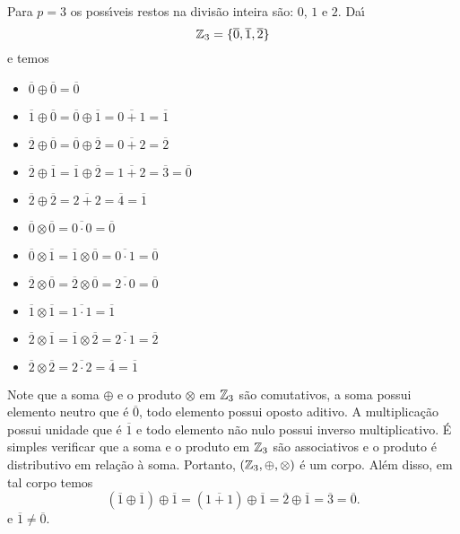 \begin{exemplo}
	Para $p = 3$ os poss{\'\i}veis restos na divis\~ao inteira s\~ao: $0$, $1$ e $2$. Da{\'\i}
	\[
	  \mathbb{Z}_3 = \{\overline{0}, \overline{1}, \overline{2}\}
	\]
	e temos
	\begin{multicols}{2}
		\begin{itemize}
			\item[] $\overline{0} \oplus \overline{0} = \overline{0}$
			\item[] $\overline{1} \oplus \overline{0} = \overline{0} \oplus \overline{1} = \overline{0 + 1} = \overline{1}$
			\item[] $\overline{2} \oplus \overline{0} = \overline{0} \oplus \overline{2} = \overline{0 + 2} = \overline{2}$
			\item[] $\overline{2} \oplus \overline{1} = \overline{1} \oplus \overline{2} = \overline{1 + 2} = \overline{3} = \overline{0}$
			\item[] $\overline{2} \oplus \overline{2} = \overline{2 + 2} = \overline{4} = \overline{1}$
			\item[] $\overline{0} \otimes \overline{0} = \overline{0\cdot 0} = \overline{0}$
			\item[] $\overline{0} \otimes \overline{1} = \overline{1} \otimes \overline{0} = \overline{0\cdot 1} = \overline{0}$
			\item[] $\overline{2} \otimes \overline{0} = \overline{2} \otimes \overline{0} = \overline{2\cdot 0} = \overline{0}$
			\item[] $\overline{1} \otimes \overline{1} = \overline{1\cdot 1} = \overline{1}$
			\item[] $\overline{2} \otimes \overline{1} = \overline{1} \otimes \overline{2} = \overline{2\cdot 1} = \overline{2}$
			\item[] $\overline{2} \otimes \overline{2} = \overline{2\cdot 2} = \overline{4} = \overline{1}$
		\end{itemize}
	\end{multicols}
	Note que a soma $\oplus$ e o produto $\otimes$ em $\mathbb{Z}_3$ s\~ao comutativos, a soma possui elemento neutro que \'e $\overline{0}$, todo elemento possui
	oposto aditivo. A multiplica\c{c}\~ao possui unidade que \'e $\overline{1}$ e todo elemento n\~ao nulo possui inverso multiplicativo. \'E simples verificar que a soma e o produto em $\mathbb{Z}_3$ s\~ao associativos e o produto \'e distributivo em rela\c{c}\~ao \`a soma. Portanto, $(\mathbb{Z}_3, \oplus, \otimes)$ \'e um corpo. Al\'em disso, em tal corpo temos
	\[
      (\overline{1} \oplus \overline{1}) \oplus \overline{1} = (\overline{1 + 1}) \oplus \overline{1} = \overline{2} \oplus \overline{1} = \overline{3} = \overline{0}.
	\]
	e $\overline{1} \ne \overline{0}$.
\end{exemplo}

